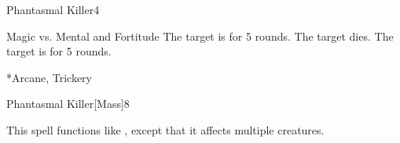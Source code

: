 \begin{spellsection}{Phantasmal Killer}{4}
    \begin{spellheader}
    \end{spellheader}
    \begin{spellcontent}
        \begin{spelltargetinginfo}
        \end{spelltargetinginfo}
        \begin{spelleffects}
            \begin{spellattack}{Magic vs. Mental and Fortitude}
                \spellsuccess[Mental] The target is \frightened for 5 rounds.
                 The target dies.
                \spellfailure The target is \shaken for 5 rounds.
            \end{spellattack}
        \end{spelleffects}
    \end{spellcontent}
    \begin{spellfooter}
        *{Arcane, Trickery}
        \miscastrandom
    \end{spellfooter}
\end{spellsection}

\begin{spellsection}{Phantasmal Killer}[Mass]{8}
    \begin{spellheader}
    \end{spellheader}
    \begin{spellcontent}
        \begin{spelltargetinginfo}
        \end{spelltargetinginfo}
        \begin{spelleffects}
            \spellspecial This spell functions like , except that it affects multiple creatures.
        \end{spelleffects}
    \end{spellcontent}
    \begin{spellfooter}
        \miscastexplode
    \end{spellfooter}
\end{spellsection}

